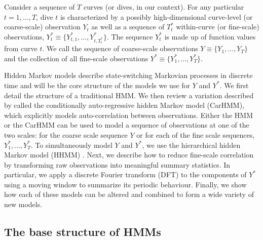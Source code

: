 
Consider a sequence of $T$ curves (or dives, in our context). For any particular $t = 1,
\ldots,T$, dive $t$ is characterized by a possibly high-dimensional curve-level (or coarse-scale) observation $Y_t$ as well as a sequence of $T^*_t$ within-curve (or fine-scale) observations, $Y^*_{t} \equiv \big\{Y^*_{t,1},\ldots,Y^*_{t,T^*_t}\big\}$. The sequence $Y^*_{t}$ is made up of function values from curve $t$. We call the sequence of coarse-scale observations $Y \equiv \big\{Y_1, \ldots, Y_T\big\}$ and the collection of all fine-scale observations $Y^* \equiv \big\{Y^*_1,\ldots,Y^*_T \big\}$.

Hidden Markov models describe state-switching Markovian processes in discrete time and will be the core structure of the models we use for $Y$ and $Y^*$. We first detail the structure of a traditional HMM. We then review a variation described by \cite{Lawler:2019} called the conditionally auto-regressive hidden Markov model (CarHMM), which explicitly models auto-correlation between observations. Either the HMM or the CarHMM can be used to model a sequence of observations at one of the two scales: for the coarse scale sequence $Y$ or for each of the fine scale sequences, $Y_1^*,\ldots, Y_T^*$. To simultaneously model $Y$ and $Y^*$, we use the hierarchical hidden Markov model (HHMM) \citep{Barajas:2017,Adam:2019}.
Next, we describe how to reduce fine-scale correlation by transforming raw observations into meaningful summary statistics. In particular, we apply a discrete Fourier transform (DFT) to the components of $Y^*$ using a moving window to summarize its periodic behaviour. Finally, we show how each of these models can be altered and combined to form a wide variety of new models.

\subsection{The base structure of HMMs}


